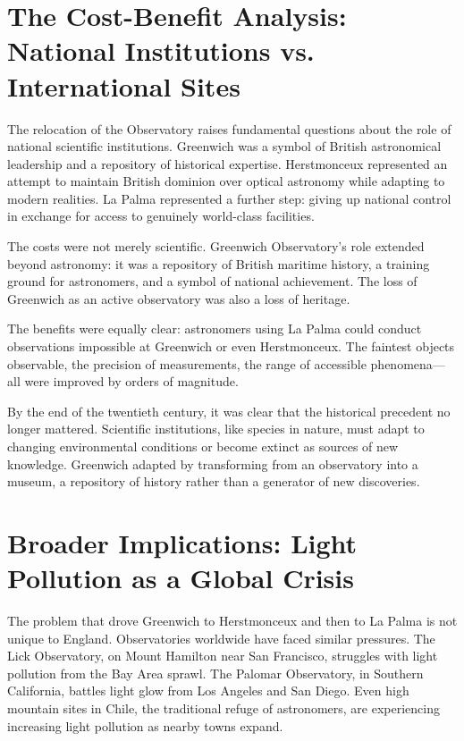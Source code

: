 \section{The Cost-Benefit Analysis: National Institutions vs. International Sites}

The relocation of the Observatory raises fundamental questions about the role of national scientific institutions. Greenwich was a symbol of British astronomical leadership and a repository of historical expertise. Herstmonceux represented an attempt to maintain British dominion over optical astronomy while adapting to modern realities. La Palma represented a further step: giving up national control in exchange for access to genuinely world-class facilities.

The costs were not merely scientific. Greenwich Observatory's role extended beyond astronomy: it was a repository of British maritime history, a training ground for astronomers, and a symbol of national achievement. The loss of Greenwich as an active observatory was also a loss of heritage.

The benefits were equally clear: astronomers using La Palma could conduct observations impossible at Greenwich or even Herstmonceux. The faintest objects observable, the precision of measurements, the range of accessible phenomena—all were improved by orders of magnitude.

By the end of the twentieth century, it was clear that the historical precedent no longer mattered. Scientific institutions, like species in nature, must adapt to changing environmental conditions or become extinct as sources of new knowledge. Greenwich adapted by transforming from an observatory into a museum, a repository of history rather than a generator of new discoveries.

\section{Broader Implications: Light Pollution as a Global Crisis}

The problem that drove Greenwich to Herstmonceux and then to La Palma is not unique to England. Observatories worldwide have faced similar pressures. The Lick Observatory, on Mount Hamilton near San Francisco, struggles with light pollution from the Bay Area sprawl. The Palomar Observatory, in Southern California, battles light glow from Los Angeles and San Diego. Even high mountain sites in Chile, the traditional refuge of astronomers, are experiencing increasing light pollution as nearby towns expand.

